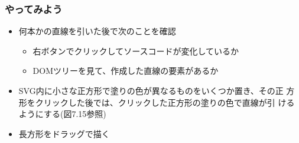 \begin{frame}[containsverbatim]
 \frametitle{やってみよう}
 \begin{itemize}
   \item 何本かの直線を引いた後で次のことを確認
  \begin{itemize}
  \item 右ボタンでクリックしてソースコードが変化しているか
   \item DOMツリーを見て、作成した直線の要素があるか
  \end{itemize}
	\item SVG内に小さな正方形で塗りの色が異なるものをいくつか置き、その正
				方形をクリックした後では、クリックした正方形の塗りの色で直線が引
				けるようにする(図7.15参照)
	\item 長方形をドラッグで描く
 \end{itemize}
\end{frame}
